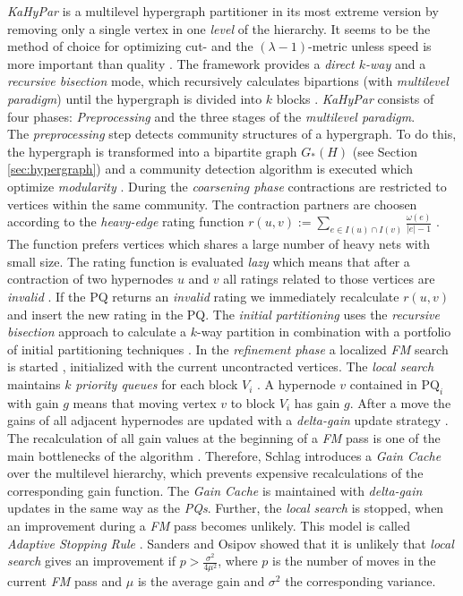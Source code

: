 \emph{KaHyPar} is a multilevel hypergraph partitioner in its most extreme version by
removing only a single vertex in one \emph{level} of the hierarchy. It seems to be the method
of choice for optimizing cut- and the $(\lambda - 1)$-metric unless speed is more important than
quality \cite{heuer2017improving}. The framework provides a \emph{direct $k$-way} \cite{akhremtsev2017engineering} 
and a \emph{recursive bisection} mode, which recursively calculates bipartions 
(with \emph{multilevel paradigm}) until the hypergraph is divided into $k$ blocks 
\cite{schlag2016k}. \emph{KaHyPar} consists of four phases: \emph{Preprocessing}
and the three stages of the \emph{multilevel paradigm}. \\
The \emph{preprocessing} step detects community structures of a hypergraph. To do this, the
hypergraph is transformed into a bipartite graph $G_*(H)$ (see Section \ref{sec:hypergraph}) and
a community detection algorithm is executed which optimize \emph{modularity} \cite{fortunato2010community,
heuer2017improving}. During the \emph{coarsening phase} contractions are restricted to vertices within the same 
community. The contraction partners are choosen according to the \emph{heavy-edge} rating function
$r(u,v) := \sum_{e \in I(u) \cap I(v)} \frac{\omega(e)}{|e|-1}$ \cite{karypis1999multilevel}. The
function prefers vertices which shares a large number of heavy nets with small size. The rating
function is evaluated \emph{lazy} which means that after a contraction of two hypernodes $u$ and
$v$ all ratings related to those vertices are \emph{invalid} \cite{schlag2016k}. If the PQ returns
an \emph{invalid} rating we immediately recalculate $r(u,v)$ and insert the new rating in the
PQ. The \emph{initial partitioning} uses the \emph{recursive bisection} approach to calculate
a $k$-way partition in combination with a portfolio of initial partitioning techniques 
\cite{heuer2015engineering}. In the \emph{refinement phase} a localized \emph{FM} search is started \cite{fiduccia1988linear},
initialized with the current uncontracted vertices. The \emph{local search} maintains $k$ \emph{priority
queues} for each block $V_i$ \cite{akhremtsev2017engineering}. A hypernode $v$ contained in 
$\text{PQ}_i$ with gain $g$ means that moving vertex $v$ to block $V_i$ has gain $g$. After a move
the gains of all adjacent hypernodes are updated with a \emph{delta-gain} update strategy \cite{papa2007hypergraph}.
The recalculation of all gain values at the beginning of a \emph{FM} pass is one of the main bottlenecks
of the algorithm \cite{papa2007hypergraph}. Therefore, Schlag \cite{akhremtsev2017engineering,
schlag2016k} introduces a \emph{Gain Cache} over the multilevel hierarchy, which prevents
expensive recalculations of the corresponding gain function. The \emph{Gain Cache} is maintained
with \emph{delta-gain} updates in the same way as the \emph{PQs}. Further, the \emph{local search}
is stopped, when an improvement during a \emph{FM} pass becomes unlikely. This model is
called \emph{Adaptive Stopping Rule} \cite{akhremtsev2017engineering}. Sanders and
Osipov \cite{osipov2010n} showed that it is unlikely that \emph{local search} gives an improvement if
$p > \frac{\sigma^2}{4\mu^2}$, where $p$ is the number of moves in the current \emph{FM} pass
and $\mu$ is the average gain and $\sigma^2$ the corresponding variance.
